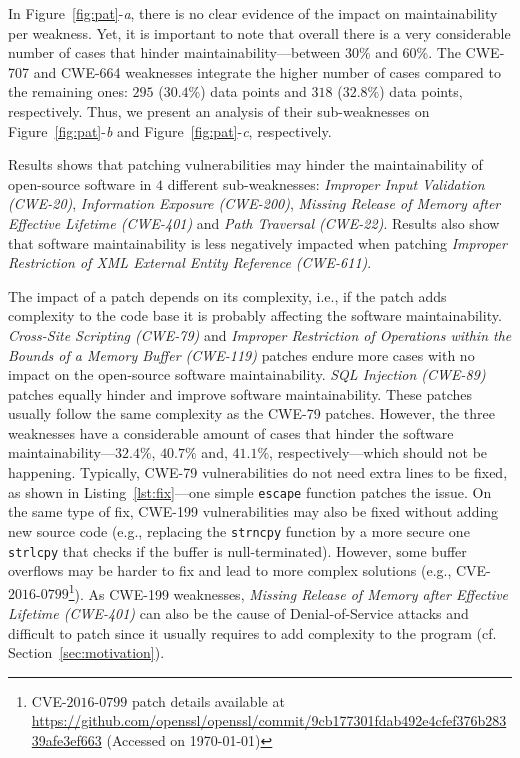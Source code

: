 \documentclass[smallextended]{svjour3}       %
\begin{document}
In Figure~\ref{fig:pat}-\emph{a}, there is no clear evidence of the impact on 
maintainability per weakness. Yet, it is important to note that
overall there is a very considerable number of cases that hinder
maintainability---between $30\%$ and $60\%$. The CWE-707 and CWE-664 
weaknesses integrate the higher number of cases compared to the remaining 
ones: $295$ ($30.4\%$) data points and $318$ ($32.8\%$) data points, respectively. 
Thus, we present an analysis of their sub-weaknesses on 
Figure~\ref{fig:pat}-\emph{b} and Figure~\ref{fig:pat}-\emph{c}, respectively. 

Results shows that patching vulnerabilities may hinder 
the maintainability of open-source software in $4$ different sub-weaknesses: 
\emph{Improper Input Validation (CWE-20)}, \emph{Information Exposure 
(CWE-200)}, \emph{Missing Release of Memory after Effective 
Lifetime (CWE-401)} and \emph{Path Traversal (CWE-22)}. Results also show that 
software maintainability is less negatively impacted when patching 
\emph{Improper Restriction of XML External Entity Reference (CWE-611)}.  

The impact of a patch depends on its complexity, i.e., if the patch
adds complexity to the code base it is probably affecting the software
maintainability. \emph{Cross-Site Scripting (CWE-79)} and 
\emph{Improper Restriction of Operations within the Bounds of 
a Memory Buffer (CWE-119)} patches endure more
cases with no impact on the open-source software maintainability. \emph{SQL Injection
(CWE-89)} patches equally hinder and improve software maintainability.
These patches usually follow the same complexity as the CWE-79 patches.
However, the three weaknesses have a considerable amount of cases that hinder
the software maintainability---$32.4\%$, $40.7\%$ and, $41.1\%$, respectively---which
should not be happening. Typically, CWE-79 vulnerabilities do not need extra lines 
to be fixed, as shown in Listing~\ref{lst:fix}---one simple 
\texttt{escape} function patches the issue. On the same type of fix,
CWE-199 vulnerabilities may also be fixed without adding new source code
(e.g., replacing the \texttt{strncpy} function by a more secure one 
\texttt{strlcpy} that checks if the buffer is null-terminated). However,
some buffer overflows may be harder to fix and lead to more complex 
solutions (e.g., 
CVE-$2016$-$0799$\footnote{CVE-$2016$-$0799$ patch details available at 
\url{https://github.com/openssl/openssl/commit/9cb177301fdab492e4cfef376b28339afe3ef663}
(Accessed on \today{})}). 
As CWE-199 weaknesses, \emph{Missing Release of Memory after Effective 
Lifetime (CWE-401)} can also be the cause of Denial-of-Service attacks and  
difficult to patch since it usually requires to add complexity to the program (cf. Section~\ref{sec:motivation}). 
\end{document}
